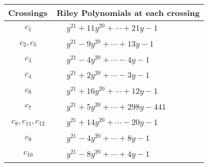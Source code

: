 \documentclass[1p]{elsarticle_modified}
\theoremstyle{definition}
\begin{document}
\begin{tabular}{m{50pt}|m{274pt}}
Crossings & \hspace{64pt}Riley Polynomials at each crossing \\
\hline $$\begin{aligned}c_{1}\end{aligned}$$&$\begin{aligned}
&y^{21}+11 y^{20}+\cdots+21 y-1
\end{aligned}$\\
\hline $$\begin{aligned}c_{2},c_{5}\end{aligned}$$&$\begin{aligned}
&y^{21}-9 y^{20}+\cdots+13 y-1
\end{aligned}$\\
\hline $$\begin{aligned}c_{3}\end{aligned}$$&$\begin{aligned}
&y^{21}-4 y^{20}+\cdots-4 y-1
\end{aligned}$\\
\hline $$\begin{aligned}c_{4}\end{aligned}$$&$\begin{aligned}
&y^{21}+2 y^{20}+\cdots-3 y-1
\end{aligned}$\\
\hline $$\begin{aligned}c_{6}\end{aligned}$$&$\begin{aligned}
&y^{21}+16 y^{20}+\cdots+12 y-1
\end{aligned}$\\
\hline $$\begin{aligned}c_{7}\end{aligned}$$&$\begin{aligned}
&y^{21}+5 y^{20}+\cdots+298 y-441
\end{aligned}$\\
\hline $$\begin{aligned}c_{8},c_{11},c_{12}\end{aligned}$$&$\begin{aligned}
&y^{21}+14 y^{20}+\cdots-20 y-1
\end{aligned}$\\
\hline $$\begin{aligned}c_{9}\end{aligned}$$&$\begin{aligned}
&y^{21}-4 y^{20}+\cdots+8 y-1
\end{aligned}$\\
\hline $$\begin{aligned}c_{10}\end{aligned}$$&$\begin{aligned}
&y^{21}-8 y^{20}+\cdots+4 y-1
\end{aligned}$\\
\hline
\end{tabular}\\~\\
\end{document}
